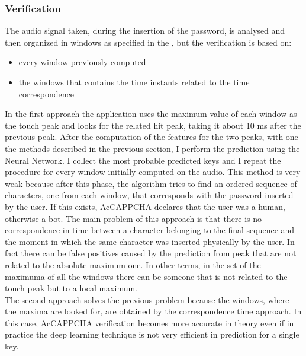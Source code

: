 \subsubsection{Verification}
The audio signal taken, during the insertion of the password, is analysed and then organized in windows as specified in the , but the verification is based on:
\begin{itemize}
\item{every window previously computed}
\item{the windows that contains the time instants related to the time correspondence}
\end{itemize}
In the first approach the application uses the maximum value of each window as the touch peak and looks for the related hit peak, taking it about 10 ms after the previous peak. After the computation of the features for the two peaks, with one the methods described in the previous section, I perform the prediction using the Neural Network. I collect the most probable predicted keys and I repeat the procedure for every window initially computed on the audio. This method is very weak because after this phase, the algorithm tries to find an ordered sequence of characters, one from each window, that corresponds with the password inserted by the user. If this exists, AcCAPPCHA declares that the user was a human, otherwise a bot. The main problem of this approach is that there is no correspondence in time between a character belonging to the final sequence and the moment in which the same character was inserted physically by the user. In fact there can be false positives caused by the prediction from peak that are not related to the absolute maximum one. In other terms, in the set of the maximuma of all the windows there can be someone that is not related to the touch peak but to a local maximum.\\
The second approach solves the previous problem because the windows, where the maxima are looked for, are obtained by the correspondence time approach. In this case, AcCAPPCHA verification becomes more accurate in theory even if in practice the deep learning technique is not very efficient in prediction for a single key.

